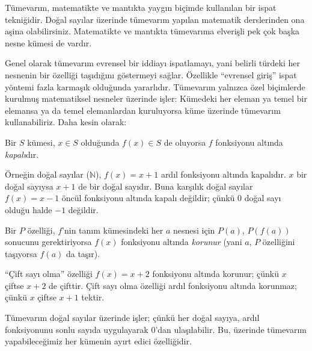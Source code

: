 



\begin{explain}
Tümevarım, matematikte ve mantıkta yaygın biçimde kullanılan bir ispat
tekniğidir. Doğal sayılar üzerinde tümevarım yapılan matematik derslerinden
ona aşina olabilirsiniz. Matematikte ve mantıkta tümevarıma elverişli pek çok
başka nesne kümesi de vardır.

Genel olarak tümevarım evrensel bir iddiayı ispatlamayı, yani belirli türdeki
her nesnenin bir özelliği taşıdığını göstermeyi sağlar. Özellikle ``evrensel
giriş'' ispat yöntemi fazla karmaşık olduğunda yararlıdır. Tümevarım yalnızca
özel biçimlerde kurulmuş matematiksel nesneler üzerinde işler: Kümedeki her
eleman ya temel bir elemansa ya da temel elemanlardan kuruluyorsa küme
üzerinde tümevarım kullanabiliriz. Daha kesin olarak:
\end{explain}

\begin{defn}
Bir $S$ kümesi, $x \in S$ olduğunda $f(x) \in S$ de oluyorsa $f$
fonksiyonu altında \emph{kapalı}dır.
\end{defn}

\begin{explain}
Örneğin doğal sayılar ($\mathbb{N}$), $f(x) = x+1$ ardıl fonksiyonu altında
kapalıdır. $x$ bir doğal sayıysa $x+1$ de bir doğal sayıdır. Buna karşılık
doğal sayılar $f(x) = x-1$ öncül fonksiyonu altında kapalı değildir; çünkü
$0$ doğal sayı olduğu halde $-1$ değildir.
\end{explain}

\begin{defn}
Bir $P$ özelliği, $f$'nin tanım kümesindeki her $a$ nesnesi için $P(a)$,
$P(f(a))$ sonucunu gerektiriyorsa $f(x)$ fonksiyonu altında \emph{korunur}
(yani $a$, $P$ özelliğini taşıyorsa $f(a)$ da taşır).
\end{defn}

\begin{explain}
``Çift sayı olma'' özelliği $f(x) = x+2$ fonksiyonu altında korunur; çünkü
$x$ çiftse $x+2$ de çifttir. Çift sayı olma özelliği ardıl fonksiyonu altında
korunmaz; çünkü $x$ çiftse $x+1$ tektir.

Tümevarım doğal sayılar üzerinde işler; çünkü her doğal sayıya, ardıl
fonksiyonunu sonlu sayıda uygulayarak $0$'dan ulaşılabilir. Bu, üzerinde
tümevarım yapabileceğimiz her kümenin ayırt edici özelliğidir.
\end{explain}

